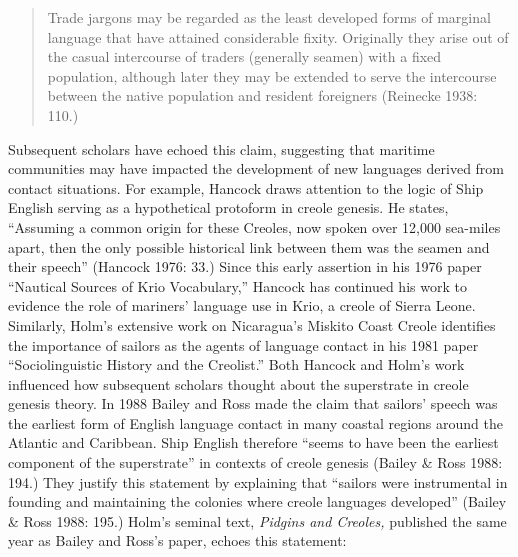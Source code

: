 \documentclass[12pt]{article}
\newenvironment{styleStandard}{\renewcommand\baselinestretch{1.0}\setlength\leftskip{0cm}\setlength\rightskip{0cm plus 1fil}\setlength\parindent{0cm}\setlength\parfillskip{0pt plus 1fil}\setlength\parskip{0in plus 1pt}\writerlistparindent\writerlistleftskip\leavevmode\normalfont\normalsize\writerlistlabel\ignorespaces}{\unskip\vspace{0in plus 1pt}\par}
\newcommand\writerlistleftskip{}
\newcommand\writerlistparindent{}
\newcommand\writerlistlabel{}
\begin{document}
\begin{quotation}
Trade jargons may be regarded as the least developed forms of marginal language that have attained considerable fixity. Originally they arise out of the casual intercourse of traders (generally seamen) with a fixed population, although later they may be extended to serve the intercourse between the native population and resident foreigners (Reinecke 1938: 110.) 

\end{quotation}
\begin{styleStandard}
Subsequent scholars have echoed this claim, suggesting that maritime communities may have impacted the development of new languages derived from contact situations. For example, Hancock draws attention to the logic of Ship English serving as a hypothetical protoform in creole genesis. He states, “Assuming a common origin for these Creoles, now spoken over 12,000 sea-miles apart, then the only possible historical link between them was the seamen and their speech” (Hancock 1976: 33.) Since this early assertion in his 1976 paper “Nautical Sources of Krio Vocabulary,” Hancock has continued his work to evidence the role of mariners’ language use in Krio, a creole of Sierra Leone. Similarly, Holm’s extensive work on Nicaragua’s Miskito Coast Creole identifies the importance of sailors as the agents of language contact in his 1981 paper “Sociolinguistic History and the Creolist.” Both Hancock and Holm’s work influenced how subsequent scholars thought about the superstrate in creole genesis theory. In 1988 Bailey and Ross made the claim that sailors’ speech\textbf{ }was the earliest form of English language contact in many coastal regions around the Atlantic and Caribbean. Ship English therefore “seems to have been the earliest component of the superstrate” in contexts of creole genesis (Bailey \& Ross 1988: 194.) They justify this statement by explaining that “sailors were instrumental in founding and maintaining the colonies where creole languages developed” (Bailey \& Ross 1988: 195.) Holm’s seminal text, \textit{Pidgins and Creoles, }published the same year as Bailey and Ross’s paper, echoes this statement: 
\end{styleStandard}
\end{document}
